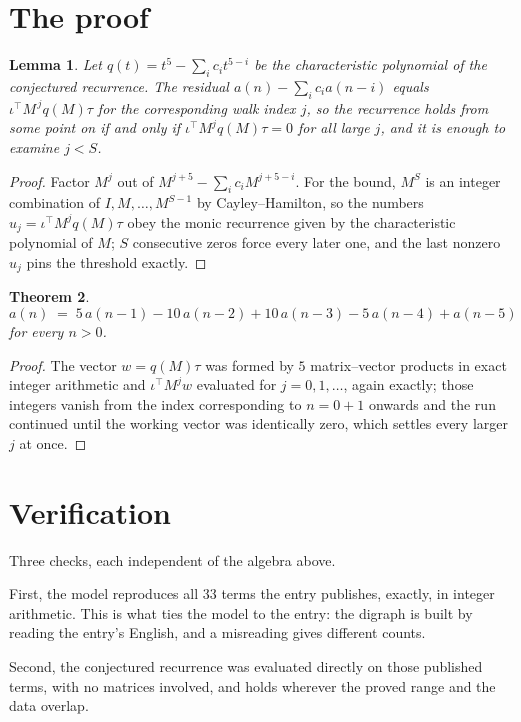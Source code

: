 \documentclass[11pt,a4paper]{article}
\theoremstyle{plain}
\newtheorem{theorem}{Theorem}
\newtheorem{lemma}[theorem]{Lemma}
\theoremstyle{definition}
\begin{document}
\section{The proof}

\begin{lemma}\label{lem:crit}
Let $q(t)=t^{5}-\sum_i c_it^{5-i}$ be the characteristic polynomial of the
conjectured recurrence. The residual $a(n)-\sum_ic_ia(n-i)$ equals
$\iota^{\!\top}M^{\,j}q(M)\tau$ for the corresponding walk index $j$, so the recurrence
holds from some point on if and only if $\iota^{\!\top}M^{j}q(M)\tau=0$ for all large $j$,
and it is enough to examine $j<S$.
\end{lemma}

\begin{proof}
Factor $M^{j}$ out of $M^{j+5}-\sum_ic_iM^{j+5-i}$. For the bound, $M^{S}$
is an integer combination of $I,M,\dots,M^{S-1}$ by Cayley--Hamilton, so the numbers
$u_j=\iota^{\!\top}M^{j}q(M)\tau$ obey the monic recurrence given by the characteristic
polynomial of $M$; $S$ consecutive zeros force every later one, and the last nonzero $u_j$
pins the threshold exactly.
\end{proof}

\begin{theorem}
\[
a(n)\;=\;5\,a(n-1) - 10\,a(n-2) + 10\,a(n-3) - 5\,a(n-4) + a(n-5)
\]
for every $n>0$.
\end{theorem}

\begin{proof}
The vector $w=q(M)\tau$ was formed by $5$ matrix--vector products in exact integer
arithmetic and $\iota^{\!\top}M^{j}w$ evaluated for $j=0,1,\dots$, again exactly; those
integers vanish from the index corresponding to $n=0+1$ onwards and the run continued
until the working vector was identically zero, which settles every larger $j$ at once.
\end{proof}

\section{Verification}

Three checks, each independent of the algebra above.

First, the model reproduces all $33$ terms the entry publishes, exactly, in integer
arithmetic. This is what ties the model to the entry: the digraph is built by reading the
entry's English, and a misreading gives different counts.

Second, the conjectured recurrence was evaluated directly on those published terms, with no
matrices involved, and holds wherever the proved range and the data overlap.
\end{document}
